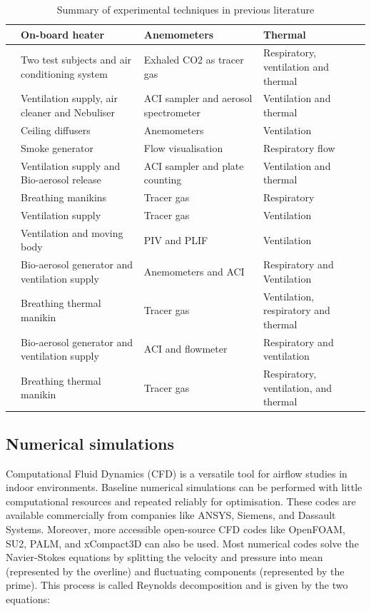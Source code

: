 \documentclass[a4paper,12pt]{elsarticle}
\begin{document}
\begin{table}[h!]
\begin{tabular}{|m{4cm}|m{3.5cm}|m{3.5cm}|m{3.5cm}|}
    \hline
    \citet{ho2021modeling}& On-board heater & Anemometers & Thermal\\
    \hline
    \citet{deng2021control}& Two test subjects and air conditioning system & Exhaled CO2 as tracer gas & Respiratory, ventilation and thermal\\
    \hline
    \citet{oksanen2022combining}& Ventilation supply, air cleaner and Nebuliser & ACI sampler and aerosol spectrometer & Ventilation and thermal\\
    \hline
    \citet{arpino2023cfd}& Ceiling diffusers & Anemometers & Ventilation \\
    \hline
    \citet{giri2022colliding}& Smoke generator & Flow visualisation & Respiratory flow\\
    \hline
    \citet{liu2020experimental}& Ventilation supply and Bio-aerosol release & ACI sampler and plate counting & Ventilation and thermal \\
    \hline
    \citet{qian2008dispersion}& Breathing manikins & Tracer gas & Respiratory\\
    \hline
    \citet{lu2020reducing}& Ventilation supply & Tracer gas & Ventilation\\
    \hline
    \citet{poussou2010flow}& Ventilation and moving body & PIV and PLIF & Ventilation \\
    \hline
    \citet{liu2020full}& Bio-aerosol generator and ventilation supply & Anemometers and ACI & Respiratory and Ventilation \\
    \hline
    \citet{cheng2021experimental}& Breathing thermal manikin & Tracer gas & Ventilation, respiratory and thermal\\
    \hline
    \citet{liu2023estimating}& Bio-aerosol generator and ventilation supply & ACI and flowmeter & Respiratory and ventilation \\
    \hline
    \citet{li2021effects}& Breathing thermal manikin & Tracer gas & Respiratory, ventilation, and thermal\\
    \hline
    \end{tabular}
    \caption{Summary of experimental techniques in previous literature}
    \label{tab:exp}
\end{table}

\subsection{Numerical simulations}

Computational Fluid Dynamics (CFD) is a versatile tool for airflow studies in indoor environments. Baseline numerical simulations can be performed with little computational resources and repeated reliably for optimisation. These codes are available commercially from companies like ANSYS, Siemens, and Dassault Systems. Moreover, more accessible open-source CFD codes like OpenFOAM, SU2, PALM, and xCompact3D can also be used. Most numerical codes solve the Navier-Stokes equations by splitting the velocity and pressure into mean (represented by the overline) and fluctuating components (represented by the prime). This process is called Reynolds decomposition and is given by the two equations:
\end{document}
